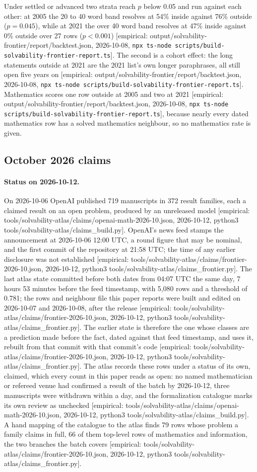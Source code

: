 \documentclass[11pt]{article}
\newcommand{\emp}[1]{\textcolor{bucketgray}{\footnotesize [empirical: #1]}}
\newcommand{\cmd}{\texttt{npx ts-node scripts/build-solvability-frontier-report.ts}}
\newcommand{\bt}{\emp{output/solvability-frontier/report/backtest.json, 2026-10-08, \cmd}}
\newcommand{\cl}{\emp{tools/solvability-atlas/claims/frontier-2026-10.json, 2026-10-12, python3 tools/solvability-atlas/claims\_frontier.py}}
\newcommand{\ldg}{\emp{tools/solvability-atlas/claims/openai-math-2026-10.json, 2026-10-12, python3 tools/solvability-atlas/claims\_build.py}}
\begin{document}
Under settled or advanced two strata reach $p$ below 0.05 and run against each other: at 2005 the 20 to 40 word band resolves at 54\% inside against 76\% outside ($p=0.045$), while at 2021 the over 40 word band resolves at 47\% inside against 0\% outside over 27 rows ($p<0.001$) \bt. The second is a cohort effect: the long statements outside at 2021 are the 2021 list's own longer paraphrases, all still open five years on \bt. Mathematics scores one row outside at 2005 and two at 2021 \bt, because nearly every dated mathematics row has a solved mathematics neighbour, so no mathematics rate is given.

\subsection{October 2026 claims}
\label{sec:october}

\paragraph{Status on 2026-10-12.}
On 2026-10-06 OpenAI published 719 manuscripts in 372 result families, each a claimed result on an open problem, produced by an unreleased model \ldg. OpenAI's news feed stamps the announcement at 2026-10-06 12:00 UTC, a round figure that may be nominal, and the first commit of the repository at 21:58 UTC; the time of any earlier disclosure was not established \cl. The last atlas state committed before both dates from 04:07 UTC the same day, 7 hours 53 minutes before the feed timestamp, with 5,080 rows and a threshold of 0.781; the rows and neighbour file this paper reports were built and edited on 2026-10-07 and 2026-10-08, after the release \cl. The earlier state is therefore the one whose classes are a prediction made before the fact, dated against that feed timestamp, and  uses it, rebuilt from that commit with that commit's code \cl. The atlas records these rows under a status of its own, claimed, which every count in this paper reads as open: no named mathematician or refereed venue had confirmed a result of the batch by 2026-10-12, three manuscripts were withdrawn within a day, and the formalization catalogue marks its own review as unchecked \ldg. A hand mapping of the catalogue to the atlas finds 79 rows whose problem a family claims in full, 66 of them top-level rows of mathematics and information, the two branches the batch covers \cl.
\end{document}
